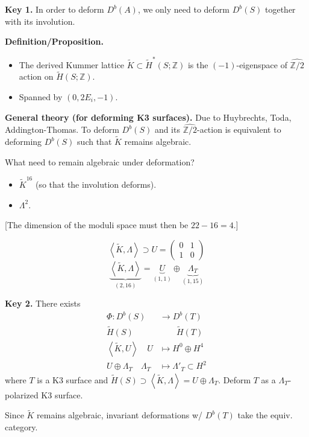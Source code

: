 \medskip\noindent
{\bf Key 1.} In order to deform $D^b(A)$, we only need to deform
$D^b(S)$ together with its involution.

\medskip\noindent
{\bf Definition/Proposition.} 
\begin{itemize}
\item The derived Kummer lattice $\tilde{K}\subset\tilde{H}^*(S;\mathbb{Z})$ 
is the $(-1)$-eigenspace of $\widehat{\mathbb{Z}/2}$ action on
$\tilde{H}(S;\mathbb{Z})$.
\item Spanned by $(0,2E_i,-1)$.
\end{itemize}

\medskip\noindent
{\bf General theory (for deforming K3 surfaces).} Due to Huybrechts, Toda,
Addington-Thomas. To deform $D^b(S)$ and its $\widehat{\mathbb{Z}/2}$-action is
equivalent to deforming $D^b(S)$ such that $\tilde{K}$ remains algebraic.

What need to remain algebraic under deformation?
\begin{itemize}
\item $\tilde{K}^{16}$ (so that the involution deforms).
\item $\Lambda^2$.
\end{itemize}
[The dimension of the moduli space must then be $22-16=4$.]

\begin{lemma}
\label{lemma-}
$$
\left<\tilde{K},\Lambda\right>\supset U=\begin{pmatrix}
0&1\\ 
1&0
\end{pmatrix}
$$
$$
\underbrace{\left<\tilde{K},\Lambda\right>}_{(2,16)}
=\underbrace{U}_{(1,1)}\oplus\underbrace{\Lambda_T}_{(1,15)}
$$
\end{lemma}

\medskip\noindent
{\bf Key 2.} There exists
\begin{align*}
\Phi: D^b(S) &\longrightarrow D^b(T) \\
\tilde{H}(S) &\qquad  \tilde{H}(T)\\
\left<\tilde{K}, U\right>\quad U &\longmapsto H^0 \oplus H^4\\
U \oplus \Lambda_T\quad \Lambda_T &\longmapsto \Lambda'_T \subset H^2
\end{align*}
where $ T$ is a K3 surface and $\tilde{H}(S) \supset \left<
\tilde{K},\Lambda\right>=U\oplus \Lambda_T$. Deform $T$ as a
$\Lambda_T$-polarized K3 surface.

Since $\tilde{K}$ remains algebraic, invariant deformations w/ $D^b(T)$ take
the equiv. category.

